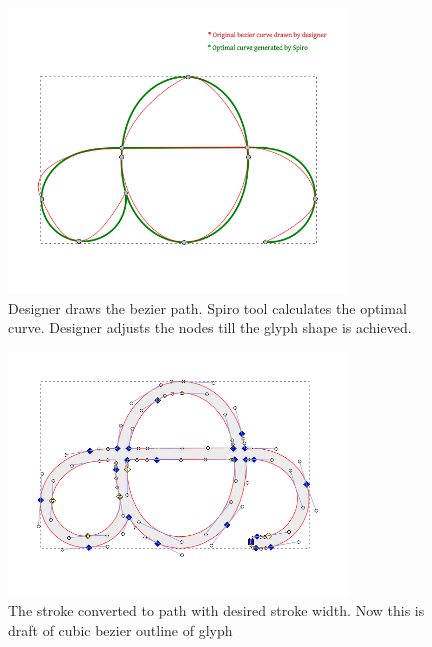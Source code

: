 \documentclass[11pt,twoside,a4paper,parskip=full]{scrartcl}
\begin{document}
\begin{figure}[h!]
	\includegraphics[width=0.8\textwidth]{images/design-1-spiral.png}
	\caption{Designer draws the bezier path. Spiro tool calculates the optimal curve. Designer adjusts the nodes till the glyph shape is achieved.}
	\label{design-1}
\end{figure}

\begin{figure}[h!]
	\includegraphics[width=0.8\textwidth]{images/design-2-stroke-to-path.png}
	\caption{The stroke converted to path with desired stroke width. Now this is draft of cubic bezier outline of glyph}
	\label{design-2}
\end{figure}
\end{document}
